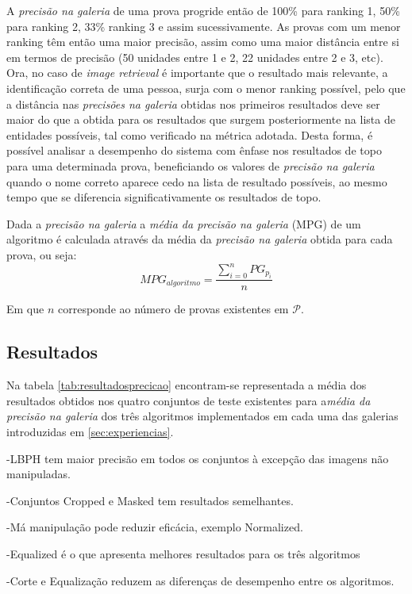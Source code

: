 A \textit{precisão na galeria} de uma prova progride então de 100\% para ranking 1, 50\% para ranking 2, 33\% ranking 3 e assim sucessivamente. As provas com um menor ranking têm então uma maior precisão, assim como uma maior distância entre si em termos de precisão (50 unidades entre 1 e 2, 22 unidades entre 2 e 3, etc). Ora, no caso de \textit{image retrieval} é importante que o resultado mais relevante, a identificação correta de uma pessoa, surja com o menor ranking possível, pelo que a distância nas \textit{precisões na galeria} obtidas nos primeiros resultados deve ser maior do que a obtida para os resultados que surgem posteriormente na lista de entidades possíveis, tal como verificado na métrica adotada. Desta forma, é possível analisar a desempenho do sistema com ênfase nos resultados de topo para uma determinada prova, beneficiando os valores de \textit{precisão na galeria} quando o nome correto aparece cedo na lista de resultado possíveis, ao mesmo tempo que se diferencia significativamente os resultados de topo.

Dada a \textit{precisão na galeria} a \textit{média da precisão na galeria} (MPG) de um algoritmo é calculada através da média da \textit{precisão na galeria} obtida para cada prova, ou seja:
\begin{equation}
MPG_{algoritmo} = \frac{ \sum\limits_{i=0}^{n} PG_{p_i} }{n}
\end{equation}

Em que $n$ corresponde ao número de provas existentes em $\mathscr{P}$.

\subsection{Resultados}
Na tabela \ref{tab:resultadosprecicao} encontram-se representada a média dos resultados obtidos nos quatro conjuntos de teste existentes para a\textit{média da precisão na galeria} dos três algoritmos implementados em cada uma das galerias introduzidas em \ref{sec:experiencias}.

-LBPH tem maior precisão em todos os conjuntos à excepção das imagens não manipuladas.

-Conjuntos Cropped e Masked tem resultados semelhantes.

-Má manipulação pode reduzir eficácia, exemplo Normalized.

-Equalized é o que apresenta melhores resultados para os três algoritmos

-Corte e Equalização reduzem as diferenças de desempenho entre os algoritmos.

